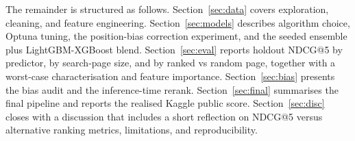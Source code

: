 The remainder is structured as follows. Section~\ref{sec:data} covers exploration, cleaning, and feature engineering. Section~\ref{sec:models} describes algorithm choice, Optuna tuning, the position-bias correction experiment, and the seeded ensemble plus LightGBM-XGBoost blend. Section~\ref{sec:eval} reports holdout NDCG@5 by predictor, by search-page size, and by ranked vs random page, together with a worst-case characterisation and feature importance. Section~\ref{sec:bias} presents the bias audit and the inference-time rerank. Section~\ref{sec:final} summarises the final pipeline and reports the realised Kaggle public score. Section~\ref{sec:disc} closes with a discussion that includes a short reflection on NDCG@5 versus alternative ranking metrics, limitations, and reproducibility.
